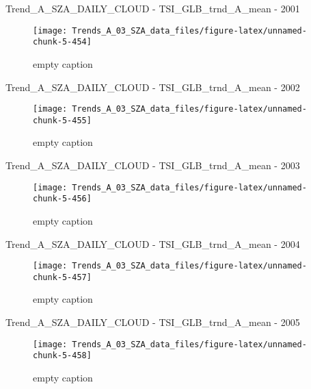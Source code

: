 \documentclass[
  10pt,
  a4paper,oneside]{article}
\begin{document}
Trend\_A\_SZA\_DAILY\_CLOUD - TSI\_GLB\_trnd\_A\_mean - 2001

\begin{figure}[!ht]

{\centering \texttt{[image: Trends\_A\_03\_SZA\_data\_files/figure-latex/unnamed-chunk-5-454]} 

}

\caption{ empty caption }\label{fig:unnamed-chunk-5-454}
\end{figure}

Trend\_A\_SZA\_DAILY\_CLOUD - TSI\_GLB\_trnd\_A\_mean - 2002

\begin{figure}[!ht]

{\centering \texttt{[image: Trends\_A\_03\_SZA\_data\_files/figure-latex/unnamed-chunk-5-455]} 

}

\caption{ empty caption }\label{fig:unnamed-chunk-5-455}
\end{figure}

Trend\_A\_SZA\_DAILY\_CLOUD - TSI\_GLB\_trnd\_A\_mean - 2003

\begin{figure}[!ht]

{\centering \texttt{[image: Trends\_A\_03\_SZA\_data\_files/figure-latex/unnamed-chunk-5-456]} 

}

\caption{ empty caption }\label{fig:unnamed-chunk-5-456}
\end{figure}

Trend\_A\_SZA\_DAILY\_CLOUD - TSI\_GLB\_trnd\_A\_mean - 2004

\begin{figure}[!ht]

{\centering \texttt{[image: Trends\_A\_03\_SZA\_data\_files/figure-latex/unnamed-chunk-5-457]} 

}

\caption{ empty caption }\label{fig:unnamed-chunk-5-457}
\end{figure}

Trend\_A\_SZA\_DAILY\_CLOUD - TSI\_GLB\_trnd\_A\_mean - 2005

\begin{figure}[!ht]

{\centering \texttt{[image: Trends\_A\_03\_SZA\_data\_files/figure-latex/unnamed-chunk-5-458]} 

}

\caption{ empty caption }\label{fig:unnamed-chunk-5-458}
\end{figure}
\end{document}
